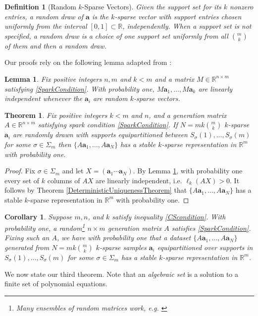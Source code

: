 \documentclass[journal, onecolumn]{IEEEtran}
\newtheorem{theorem}{Theorem}
\newtheorem{lemma}{Lemma}
\newtheorem{definition}{Definition}
\newtheorem{corollary}{Corollary}
\begin{document}
\begin{definition}[Random $k$-Sparse Vectors]\label{RandomDraw}
Given the support set for its $k$ nonzero entries, a random draw of $\mathbf{a}$ is the $k$-sparse vector with support entries chosen uniformly from the interval $[0, 1] \subset \mathbb{R}$, independently. When a support set is not specified, a random draw is a choice of one support set uniformly from all ${m \choose k}$ of them and then a random draw.
\end{definition}

Our proofs rely on the following lemma adapted from \cite{HS11}:
\begin{lemma}\label{HS11lemma2}
Fix positive integers $n, m$ and $k < m$ and a matrix $M \in \mathbb{R}^{n \times m}$ satisfying \eqref{SparkCondition}. With probability one, $M\mathbf{a}_1, \ldots, M\mathbf{a}_k$ are linearly independent whenever the $\mathbf{a}_i$ are random $k$-sparse vectors.
\end{lemma}

\begin{theorem}\label{Theorem2}
Fix positive integers $k < m$ and $n$, and a generation matrix $A \in \mathbb{R}^{n \times m}$ satisfying spark condition \eqref{SparkCondition}. If $N = mk{m \choose k}$ $k$-sparse $\mathbf{a}_i$ are randomly drawn with supports equipartitioned between $S_\sigma(1), \ldots, S_\sigma(m)$ for some $\sigma \in \Sigma_m$ then $\{A\mathbf{a}_1, \ldots, A\mathbf{a}_N\}$ has a stable $k$-sparse representation in $\mathbb{R}^m$ with probability one.
\end{theorem}

\begin{proof}
Fix  $\sigma \in \Sigma_m$ and let $X = (\mathbf{a}_1 \cdots \mathbf{a}_N)$. By Lemma \ref{HS11lemma2}, with probability one every set of $k$ columns of $AX$ are linearly independent, i.e. $\ell_k(AX) > 0$. It follows by Theorem \ref{DeterministicUniquenessTheorem} that $\{A\mathbf{a}_1, \ldots, A\mathbf{a}_N\}$ has a stable $k$-sparse representation in $\mathbb{R}^m$ with probability one. 
\end{proof} 

\begin{corollary}
Suppose $m, n$, and $k$ satisfy inequality \eqref{CScondition}. With probability one, a random\footnote{Many ensembles of random matrices work, e.g. \cite{??}} $n \times m$ generation matrix $A$ satisfies \eqref{SparkCondition}. Fixing such an $A$, we have with probability one that a dataset $\{A\mathbf{a}_1, \ldots , A\mathbf{a}_N\}$ generated from $N = mk{m \choose k}$ $k$-sparse samples $\mathbf{a}_i$ equipartitioned over supports in $S_\sigma(1), \ldots, S_\sigma(m)$ for some $\sigma \in \Sigma_m$ has a stable $k$-sparse representation in $\mathbb{R}^m$.
\end{corollary}
We now state our third theorem. Note that an \emph{algebraic set} is a solution to a finite set of polynomial equations. 
\end{document}
